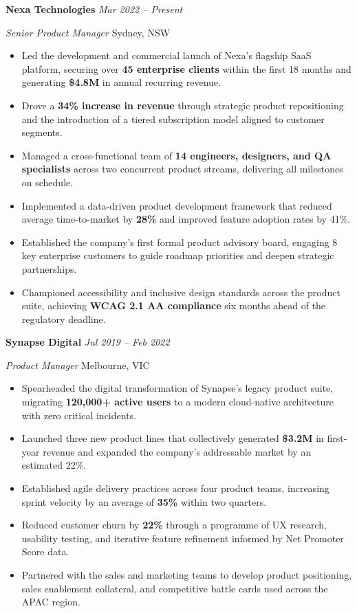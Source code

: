 \documentclass[11pt,a4paper]{article}
\newcommand{\ressection}[1]{%
  \vspace{1.6\baselineskip}%
  \noindent{\color{ausnavy}\Large\bfseries\MakeUppercase{#1}}%
  \vspace{0.1\baselineskip}\par
  \noindent{\color{austeal}\rule{\textwidth}{1.2pt}}%
  \vspace{0.7\baselineskip}\par
}
\newcommand{\roleheader}[4]{%
  \noindent\textbf{\large #1} \hfill \textcolor{ausnavy}{\small\textit{#2}}\par
  \noindent\textit{#3} \hfill \textcolor{ausdark}{\small #4}\par
  \vspace{0.25cm}%
}
\begin{document}
\ressection{Professional Experience}

\roleheader{Nexa Technologies}{Mar 2022 -- Present}{Senior Product Manager}{Sydney, NSW}

\begin{itemize}
  \item Led the development and commercial launch of Nexa's flagship SaaS platform, securing over \textbf{45 enterprise clients} within the first 18 months and generating \textbf{\$4.8M} in annual recurring revenue.
  \item Drove a \textbf{34\% increase in revenue} through strategic product repositioning and the introduction of a tiered subscription model aligned to customer segments.
  \item Managed a cross-functional team of \textbf{14 engineers, designers, and QA specialists} across two concurrent product streams, delivering all milestones on schedule.
  \item Implemented a data-driven product development framework that reduced average time-to-market by \textbf{28\%} and improved feature adoption rates by 41\%.
  \item Established the company's first formal product advisory board, engaging 8 key enterprise customers to guide roadmap priorities and deepen strategic partnerships.
  \item Championed accessibility and inclusive design standards across the product suite, achieving \textbf{WCAG 2.1 AA compliance} six months ahead of the regulatory deadline.
\end{itemize}

\vspace{0.6cm}

\roleheader{Synapse Digital}{Jul 2019 -- Feb 2022}{Product Manager}{Melbourne, VIC}

\begin{itemize}
  \item Spearheaded the digital transformation of Synapse's legacy product suite, migrating \textbf{120,000+ active users} to a modern cloud-native architecture with zero critical incidents.
  \item Launched three new product lines that collectively generated \textbf{\$3.2M} in first-year revenue and expanded the company's addressable market by an estimated 22\%.
  \item Established agile delivery practices across four product teams, increasing sprint velocity by an average of \textbf{35\%} within two quarters.
  \item Reduced customer churn by \textbf{22\%} through a programme of UX research, usability testing, and iterative feature refinement informed by Net Promoter Score data.
  \item Partnered with the sales and marketing teams to develop product positioning, sales enablement collateral, and competitive battle cards used across the APAC region.
\end{itemize}
\end{document}
